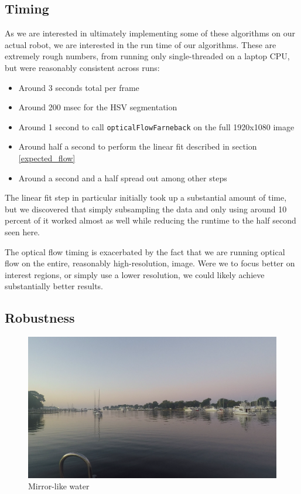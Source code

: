 \documentclass{article}
\begin{document}
\subsection{Timing}

As we are interested in ultimately implementing some of these algorithms on our
actual robot, we are interested in the run time of our algorithms. These
are extremely rough numbers, from running only single-threaded on a laptop CPU,
but were reasonably consistent across runs:
\begin{itemize}
\item Around 3 seconds total per frame
\item Around 200 msec for the HSV segmentation
\item Around 1 second to call \texttt{opticalFlowFarneback} on the full
      1920x1080 image
\item Around half a second to perform the linear fit described in section
      \ref{expected_flow}
\item Around a second and a half spread out among other steps
\end{itemize}

The linear fit step in particular initially took up a substantial amount of
time, but we discovered that simply subsampling the data and only using around
10 percent of it worked almost as well while reducing the runtime to the half
second seen here.

The optical flow timing is exacerbated by the fact that we are running optical
flow on the entire, reasonably high-resolution, image. Were we to focus better
on interest regions, or simply use a lower resolution, we could likely achieve
substantially better results.

\subsection{Robustness}

\begin{figure}[H]
\includegraphics[width=12cm]{sample1}
\centering
\caption{Mirror-like water}
\label{fig:mirror}
\end{figure}
\end{document}

